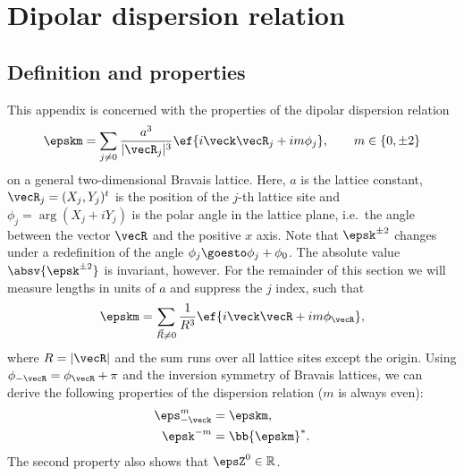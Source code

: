 \chapter{Dipolar dispersion relation}
\label{dipolar_dispersion}

\section{Definition and properties}
This appendix is concerned with the properties of the dipolar dispersion relation~\cite{Peter2012b,Syzranov2014,Peter2014}
\begin{align}
    \epskm = \sum_{j\ne 0} \frac{a^3}{|\vecR_j|^3}\ef{i\veck \vecR_j + i m \phi_{j}},\qquad m \in \{0, \pm 2\}
\end{align}
on a general two-dimensional Bravais lattice.
Here, $a$ is the lattice constant, $\vecR_j=(X_j, Y_j)^t$ is the position of the $j$-th lattice site and $\phi_j = \arg(X_j+i Y_j)$ is the polar angle in the lattice plane, i.e.~the angle between the vector $\vecR$ and the positive $x$ axis. Note that $\epsk^{\pm 2}$ changes under a redefinition of the angle $\phi_j \goesto \phi_j + \phi_0$. The absolute value $\absv{\epsk^{\pm 2}}$ is invariant, however. For the remainder of this section we will measure lengths in units of $a$ and suppress the $j$ index, such that
\begin{align}
    \epskm = \sum_{\vec{R}\ne0} \frac{1}{R^3}\ef{i\veck \vecR + i m \phi_{\vecR}},
\end{align}
where $R=|\vecR|$ and the sum runs over all lattice sites except the origin.
Using $\phi_{-\vecR} = \phi_\vecR + \pi$ and the inversion symmetry of Bravais lattices,
we can derive the following properties of the dispersion relation ($m$ is always even):
\begin{align}
    \eps_{-\veck}^m &= \epskm, \\
    \epsk^{-m} &= \bb{ \epskm }^*.
\end{align}
The second property also shows that $\epsZ^0 \in \mathbb{R}$.


